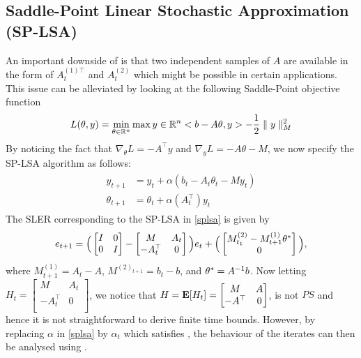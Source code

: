 \subsection{Saddle-Point Linear Stochastic Approximation (SP-LSA)}
An important downside of  is that two independent samples of $A$ are available in the form of $A^{(1)\top}_t$ and $A^{(2)}_t$ which might be possible in certain applications. This issue can be alleviated by looking at the following Saddle-Point objective function
\begin{align}
L(\theta,y)=\min_{\theta\in \mathbb{R}^n}\max{y\in \mathbb{R}^n}<b-A\theta,y>-\frac{1}{2}\parallel y\parallel_M ^2
\end{align}
By noticing the fact that $\nabla_\theta L =-A^\top y$ and $\nabla_{y}L=-A\theta-M$, we now specify the SP-LSA algorithm as follows:
\begin{align}\label{splsa}
\begin{split}
y_{t+1}&=y_t+\alpha (b_t-A_t\theta_t- M y_t)\\
\theta_{t+1}&=\theta_t+\alpha(A_t^\top)y_t
\end{split}
\end{align}
The SLER corresponding to the SP-LSA in \eqref{splsa} is given by
\begin{align}
e_{t+1}=\Big(\begin{bmatrix} I & 0 \\ 0 &I\\\end{bmatrix} -\begin{bmatrix} M & A_t \\ -A_t^\top &0\\\end{bmatrix}\Big)e_t+\Big(\begin{bmatrix} M^{(2)}_{t_1}-M^{(1)}_{t+1}\theta^*  \\ 0\\\end{bmatrix}\Big),
\end{align}
where $M^{(1)}_{t+1}=A_t-A$, $M^{(2)_{t+1}}=b_t-b$,  and $\theta^*=A^{-1}b$. Now letting $H_t=\begin{bmatrix} M & A_t \\ -A_t^\top &0\\\end{bmatrix}$, we notice that $H=\mathbf{E}[H_t]=\begin{bmatrix} M & A \\ -A^\top &0\\\end{bmatrix}$, is not $PS$ and hence it is not straightforward to derive finite time bounds. However, by replacing $\alpha$ in \eqref{splsa} by $\alpha_t$ which satisfies , the behaviour of the iterates can then be analysed using .
